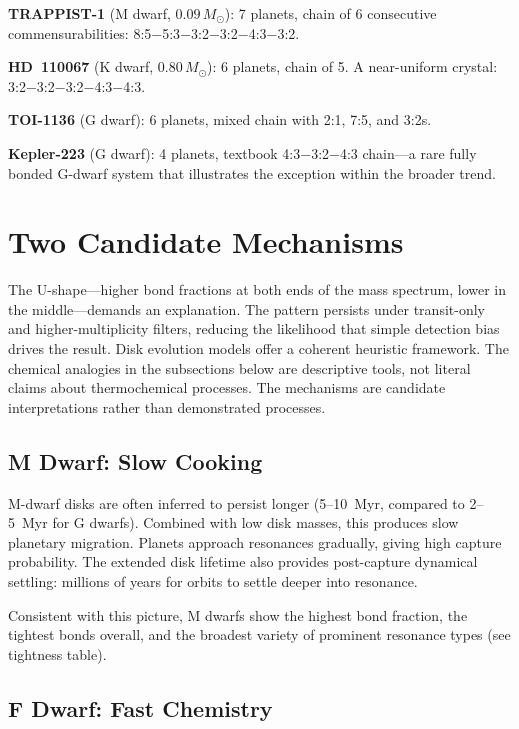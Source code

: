 \documentclass[twocolumn,usenatbib]{mnras}
\begin{document}
\textbf{TRAPPIST-1} (M dwarf, $0.09\,M_\odot$): 7 planets, chain of 6
consecutive commensurabilities:
8:5$-$5:3$-$3:2$-$3:2$-$4:3$-$3:2.

\textbf{HD~110067} (K dwarf, $0.80\,M_\odot$): 6 planets, chain of 5. A
near-uniform crystal: 3:2$-$3:2$-$3:2$-$4:3$-$4:3.

\textbf{TOI-1136} (G dwarf): 6 planets, mixed chain with 2:1, 7:5, and 3:2s.

\textbf{Kepler-223} (G dwarf): 4 planets, textbook
4:3$-$3:2$-$4:3 chain---a rare fully bonded G-dwarf system that illustrates
the exception within the broader trend.

\section{Two Candidate Mechanisms}
\label{sec:mechanisms}

The U-shape---higher bond fractions at both ends of the mass spectrum, lower
in the middle---demands an explanation. The pattern persists under
transit-only and higher-multiplicity filters, reducing the likelihood that
simple detection bias drives the result. Disk evolution models offer a coherent
heuristic framework. The chemical analogies in the subsections below are
descriptive tools, not literal claims about thermochemical processes. The
mechanisms are candidate interpretations rather than demonstrated processes.

\subsection{M Dwarf: Slow Cooking}

M-dwarf disks are often inferred to persist longer (5--10~Myr, compared to
2--5~Myr for G dwarfs)\citep{yasui2010,haisch2001}. Combined with low disk
masses, this produces slow planetary migration. Planets approach resonances
gradually, giving high capture probability. The extended disk lifetime also
provides post-capture dynamical settling: millions of years for orbits to
settle deeper into resonance.

Consistent with this picture, M dwarfs show the highest bond fraction, the
tightest bonds overall, and the broadest variety of prominent resonance types
(see tightness table).

\subsection{F Dwarf: Fast Chemistry}
\end{document}
